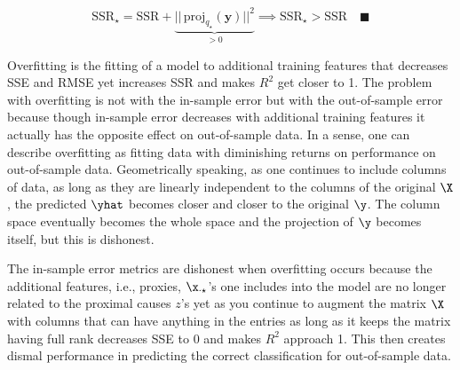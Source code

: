 \documentclass[12pt]{article}
\begin{document}
\begin{enumerate}
\begin{tcolorbox}[colback = white, sharp corners]
\[
	\text{SSR}_{\star} = \text{SSR} + \underbrace{||\, \text{proj}_{q_{\star}}(\mathbf{y}) ||^2}_{> 0} \implies \text{SSR}_{\star} > \text{SSR} \quad \blacksquare
\]


\end{tcolorbox}


\begin{tcolorbox}[colback = white, sharp corners]

Overfitting is the fitting of a model to additional training features that decreases SSE and RMSE yet increases SSR and makes $R^2$ get closer to 1. The problem with overfitting is not with the in-sample error but with the out-of-sample error because though in-sample error decreases with additional training features it actually has the opposite effect on out-of-sample data. In a sense, one can describe overfitting as fitting data with diminishing returns on performance on out-of-sample data. Geometrically speaking, as one continues to include columns of data, as long as they are linearly independent to the columns of the original $\X$, the predicted $\yhat$ becomes closer and closer to the original $\y$. The column space eventually becomes the whole space and the projection of $\y$ becomes itself, but this is dishonest.

\end{tcolorbox}


\begin{tcolorbox}[colback = white, sharp corners]
The in-sample error metrics are dishonest when overfitting occurs because the additional features, i.e., proxies, $\x_{\cdot \star}$'s one includes into the model are no longer related to the proximal causes $z$'s yet as you continue to augment the matrix $\X$ with columns that can have anything in the entries as long as it keeps the matrix having full rank decreases SSE to 0 and makes $R^2$ approach 1. This then creates dismal performance in predicting the correct classification for out-of-sample data. 
\end{tcolorbox}


\end{enumerate}
\end{document}
